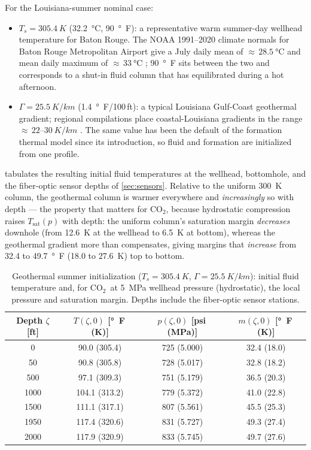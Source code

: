 \documentclass[11pt]{article}
\newcommand{\co}{CO$_2$}
\begin{document}
For the Louisiana-summer nominal case:
\begin{itemize}
\item $T_s = \SI{305.4}{K}$ (\SI{32.2}{\celsius}, \SI{90}{\degree F}):
a representative warm summer-day wellhead temperature for Baton Rouge.
The NOAA 1991--2020 climate normals for Baton Rouge Metropolitan
Airport give a July daily mean of ${\approx}\,\SI{28.5}{\celsius}$ and
mean daily maximum of ${\approx}\,\SI{33}{\celsius}$ \citep{noaa2021};
\SI{90}{\degree F} sits between the two and corresponds to a shut-in
fluid column that has equilibrated during a hot afternoon.
\item $\Gamma = \SI{25.5}{K/km}$ (\SI{1.4}{\degree F}/100\,ft): a
typical Louisiana Gulf-Coast geothermal gradient; regional compilations
place coastal-Louisiana gradients in the range
${\approx}\,22$--$\SI{30}{K/km}$ \citep{blackwell2011}. The same value
has been the default of the formation thermal model since its
introduction, so fluid and formation are initialized from one profile.
\end{itemize}
 tabulates the resulting initial fluid temperatures at
the wellhead, bottomhole, and the fiber-optic sensor depths of
\cref{sec:sensors}. Relative to the uniform \SI{300}{K} column, the
geothermal column is warmer everywhere and \emph{increasingly} so with
depth --- the property that matters for \co, because hydrostatic
compression raises $T_{\mathrm{sat}}(p)$ with depth: the uniform
column's saturation margin \emph{decreases} downhole (from \SI{12.6}{K}
at the wellhead to \SI{6.5}{K} at bottom), whereas the geothermal
gradient more than compensates, giving margins that \emph{increase}
from 32.4 to \SI{49.7}{\degree F} (18.0 to \SI{27.6}{K}) top to
bottom.

\begin{table}[htb]
\centering
\caption{Geothermal summer initialization ($T_s = \SI{305.4}{K}$,
$\Gamma = \SI{25.5}{K/km}$): initial fluid temperature and, for \co\
at \SI{5}{MPa} wellhead pressure (hydrostatic), the local pressure and
saturation margin. Depths include the fiber-optic sensor stations.}
\label{tab:geoT}
\begin{tabular}{cccc}
\toprule
Depth $\zeta$ [ft] & $T(\zeta,0)$ [\si{\degree F}\,(K)] &
$p(\zeta,0)$ [psi\,(MPa)] & $m(\zeta,0)$ [\si{\degree F}\,(K)]\\
\midrule
0    & 90.0 (305.4)  & 725 (5.000) & 32.4 (18.0)\\
50   & 90.8 (305.8)  & 728 (5.017) & 32.8 (18.2)\\
500  & 97.1 (309.3)  & 751 (5.179) & 36.5 (20.3)\\
1000 & 104.1 (313.2) & 779 (5.372) & 41.0 (22.8)\\
1500 & 111.1 (317.1) & 807 (5.561) & 45.5 (25.3)\\
1950 & 117.4 (320.6) & 831 (5.727) & 49.3 (27.4)\\
2000 & 117.9 (320.9) & 833 (5.745) & 49.7 (27.6)\\
\bottomrule
\end{tabular}
\end{table}
\end{document}
